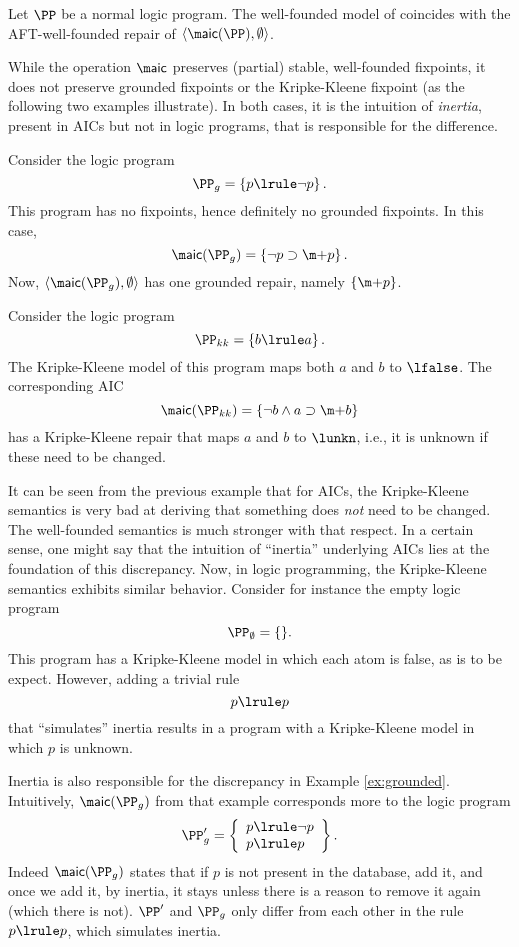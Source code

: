 \begin{corollary}
 Let $\PP$ be a normal logic program. The well-founded model of \PP coincides with the AFT-well-founded repair of $\langle \aicop(\PP),\emptyset\rangle$. 
\end{corollary}

 While the operation $\aicop$ preserves (partial) stable, well-founded  fixpoints, it does not preserve grounded fixpoints or the Kripke-Kleene fixpoint (as the following two examples illustrate). In both cases, it is the intuition of \emph{inertia}, present in AICs but not in logic programs, that is responsible for the difference. 

 
\begin{example}\label{ex:grounded}
  Consider the logic program 
  \[\PP_g = \left\{p\lrule \lnot p \right\}.\]
  This program has no fixpoints, hence definitely no grounded fixpoints. 
  In this case, 
  \[\aicop(\PP_g) = \left\{\lnot p \aicrule \add p\right\}.\]
  Now, $\langle \aicop(\PP_g),\emptyset\rangle$ has one grounded repair, namely $\{\add p\}$. 
\end{example}

\begin{example}
 Consider the logic program
 \[\PP_{kk}=\left\{ b\lrule a\right\}.\]
 The Kripke-Kleene model of this program maps both $a$ and $b$ to $\lfalse$. 
 The corresponding AIC 
 \[\aicop(\PP_{kk}) = \{\lnot b \land a \aicrule \add b\}\] 
 has a Kripke-Kleene repair that maps $a$ and $b$ to $\lunkn$, i.e., it is unknown if these need to be changed. 
\end{example}


It can be seen from the previous example that for AICs, the Kripke-Kleene semantics is very bad at deriving that something does \emph{not} need to be changed. The well-founded semantics is much stronger with that respect. 
In a certain sense, one might say that the intuition of ``inertia'' underlying AICs lies at the foundation of this discrepancy. 
Now, in logic programming, the Kripke-Kleene semantics exhibits similar behavior. Consider for instance the empty logic program 
\[ \PP_\emptyset = \{ \}.\]
This program has a Kripke-Kleene model in which each atom is false, as is to be expect. 
However, adding a trivial rule
\[p\lrule p\]
 that ``simulates'' inertia results in a program with a Kripke-Kleene model in which $p$ is unknown.
 
 Inertia is also responsible for the discrepancy in Example \ref{ex:grounded}. 
 Intuitively, $\aicop(\PP_g)$ from that example corresponds more to the logic program
  \[\PP_g' = \left\{\begin{array}{l}p\lrule \lnot p \\ p\lrule p  \end{array}\right\}.\]
  Indeed $\aicop(\PP_g)$ states that if $p$ is not present in the database, add it, and once we add it, by inertia, it stays unless there is a reason to remove it again (which there is not). 
  $\PP'$ and $\PP_g$ only differ from each other in the rule $p\lrule p$, which simulates inertia.
 
